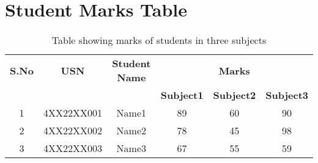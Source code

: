 \documentclass{article}
\begin{document}
\section*{Student Marks Table}

\begin{table}[h!]
\centering
\begin{tabular}{|c|c|c|c|c|c|}
\hline
\textbf{S.No} & \textbf{USN} & \textbf{Student Name} & \multicolumn{3}{c|}{\textbf{Marks}} \\
\cline{4-6}
 & & & \textbf{Subject1} & \textbf{Subject2} & \textbf{Subject3} \\
\hline
1 & 4XX22XX001 & Name1 & 89 & 60 & 90 \\
\hline
2 & 4XX22XX002 & Name2 & 78 & 45 & 98 \\
\hline
3 & 4XX22XX003 & Name3 & 67 & 55 & 59 \\
\hline
\end{tabular}
\caption{Table showing marks of students in three subjects}
\end{table}
\end{document}
